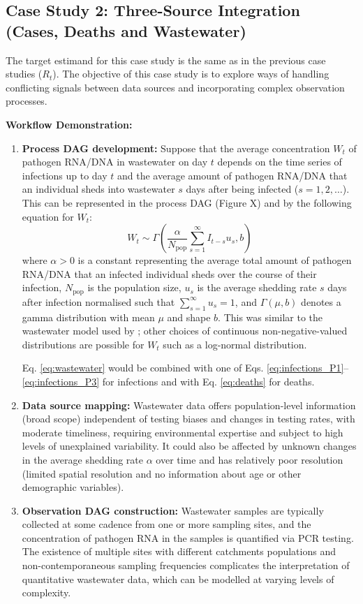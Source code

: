 \documentclass{article}
\begin{document}
\subsection{Case Study 2: Three-Source Integration (Cases, Deaths and Wastewater)}

The target estimand for this case study is the same as in the previous case studies ($R_t$). The objective of this case study is to explore ways of handling conflicting signals between data sources and incorporating complex observation processes.

\textbf{Workflow Demonstration:}
\begin{enumerate}
    \item \textbf{Process DAG development:} 
    Suppose that the average concentration $W_t$ of pathogen RNA/DNA in wastewater on day $t$ depends on the time series of infections up to day $t$ and the average amount of pathogen RNA/DNA that an individual sheds into wastewater $s$ days after being infected ($s=1,2,\ldots$). This can be represented in the process DAG (Figure X) and by the following equation for $W_t$:
    \begin{equation} \label{eq:wastewater}
        W_t \sim \Gamma\left( \frac{\alpha}{N_\mathrm{pop}}\sum_{s=1}^\infty I_{t-s}u_s, b   \right)
    \end{equation}
    where $\alpha>0$ is a constant representing the average total amount of pathogen RNA/DNA that an infected individual sheds over the course of their infection, $N_\mathrm{pop}$ is the population size, $u_s$ is the average shedding rate $s$ days after infection normalised such that $\sum_{s=1}^\infty u_s=1$, and $\Gamma(\mu,b)$ denotes a gamma distribution with mean $\mu$ and shape $b$. This was similar to the wastewater model used by \cite{watson2024jointly}; other choices of continuous non-negative-valued distributions are possible for $W_t$ such as a log-normal distribution.

    Eq. \eqref{eq:wastewater} would be combined with one of Eqs. \eqref{eq:infections_P1}--\eqref{eq:infections_P3} for infections and with Eq. \eqref{eq:deaths} for deaths.
    \item \textbf{Data source mapping:} Wastewater data offers population-level information (broad scope) independent of testing biases and changes in testing rates, with moderate timeliness, requiring environmental expertise and subject to high levels of unexplained variability. It could also be affected by unknown changes in the average shedding rate $\alpha$ over time and has relatively poor resolution (limited spatial resolution and no information about age or other demographic variables). 
    \item \textbf{Observation DAG construction:} 
   Wastewater samples are typically collected at some cadence from one or more sampling sites, and the concentration of pathogen RNA in the samples is quantified via PCR testing. 
   The existence of multiple sites with different catchments populations and non-contemporaneous sampling frequencies complicates the interpretation of quantitative wastewater data, which can be modelled at varying levels of complexity.  
   

\end{enumerate}
\end{document}
